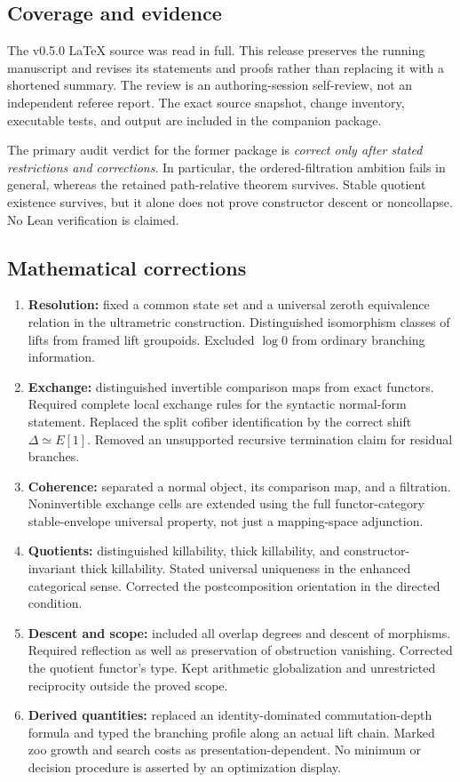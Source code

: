 \documentclass[11pt]{article}
\theoremstyle{definition}
\theoremstyle{remark}
\begin{document}
\subsection{Coverage and evidence}
The v0.5.0 LaTeX source was read in full. This release preserves the running manuscript and revises its statements and proofs rather than replacing it with a shortened summary. The review is an authoring-session self-review, not an independent referee report. The exact source snapshot, change inventory, executable tests, and output are included in the companion package.

The primary audit verdict for the former package is \emph{correct only after stated restrictions and corrections}. In particular, the ordered-filtration ambition fails in general, whereas the retained path-relative theorem survives. Stable quotient existence survives, but it alone does not prove constructor descent or noncollapse. No Lean verification is claimed.

\subsection{Mathematical corrections}
\begin{enumerate}
\item \textbf{Resolution:} fixed a common state set and a universal zeroth equivalence relation in the ultrametric construction. Distinguished isomorphism classes of lifts from framed lift groupoids. Excluded $\log 0$ from ordinary branching information.
\item \textbf{Exchange:} distinguished invertible comparison maps from exact functors. Required complete local exchange rules for the syntactic normal-form statement. Replaced the split cofiber identification by the correct shift $\Delta\simeq E[1]$. Removed an unsupported recursive termination claim for residual branches.
\item \textbf{Coherence:} separated a normal object, its comparison map, and a filtration. Noninvertible exchange cells are extended using the full functor-category stable-envelope universal property, not just a mapping-space adjunction.
\item \textbf{Quotients:} distinguished killability, thick killability, and constructor-invariant thick killability. Stated universal uniqueness in the enhanced categorical sense. Corrected the postcomposition orientation in the directed condition.
\item \textbf{Descent and scope:} included all overlap degrees and descent of morphisms. Required reflection as well as preservation of obstruction vanishing. Corrected the quotient functor's type. Kept arithmetic globalization and unrestricted reciprocity outside the proved scope.
\item \textbf{Derived quantities:} replaced an identity-dominated commutation-depth formula and typed the branching profile along an actual lift chain. Marked zoo growth and search costs as presentation-dependent. No minimum or decision procedure is asserted by an optimization display.
\end{enumerate}
\end{document}
